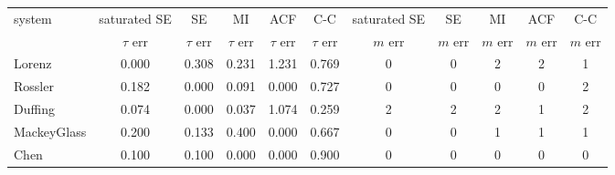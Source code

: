\begin{tabular}{lcccccccccc}
\toprule
system & saturated SE & SE & MI & ACF & C-C & saturated SE & SE & MI & ACF & C-C \\
\cmidrule(lr){2-6}\cmidrule(lr){7-11}
 & $\tau$ err & $\tau$ err & $\tau$ err & $\tau$ err & $\tau$ err & $m$ err & $m$ err & $m$ err & $m$ err & $m$ err \\
\midrule
Lorenz & 0.000 & 0.308 & 0.231 & 1.231 & 0.769 & 0 & 0 & 2 & 2 & 1 \\
Rossler & 0.182 & 0.000 & 0.091 & 0.000 & 0.727 & 0 & 0 & 0 & 0 & 2 \\
Duffing & 0.074 & 0.000 & 0.037 & 1.074 & 0.259 & 2 & 2 & 2 & 1 & 2 \\
MackeyGlass & 0.200 & 0.133 & 0.400 & 0.000 & 0.667 & 0 & 0 & 1 & 1 & 1 \\
Chen & 0.100 & 0.100 & 0.000 & 0.000 & 0.900 & 0 & 0 & 0 & 0 & 0 \\
\bottomrule
\end{tabular}
